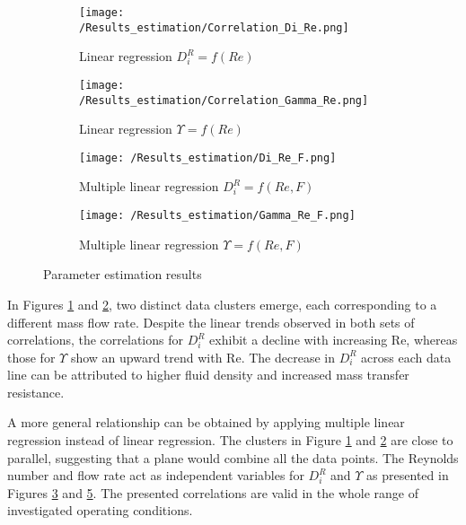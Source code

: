 \documentclass[../Supercritical_fluid_extraction_of_essential_oil_from_chamomile.tex]{subfiles}
\begin{document}
	\begin{figure}[!h]
		\centering
		\begin{subfigure}{0.48\columnwidth}
			\centering
			\texttt{[image: /Results\_estimation/Correlation\_Di\_Re.png]}
			\caption{Linear regression $D_i^R = f(Re)$}
			\label{fig: Correlations_Di_Re}
		\end{subfigure}
		\hfill
		\begin{subfigure}{0.48\columnwidth}
			\centering
			\texttt{[image: /Results\_estimation/Correlation\_Gamma\_Re.png]}
			\caption{Linear regression $\Upsilon = f(Re)$}
			\label{fig: Correlations_Gamma_Re}
		\end{subfigure}
		\hfill
		\begin{subfigure}{0.48\columnwidth}
			\centering
			\texttt{[image: /Results\_estimation/Di\_Re\_F.png]}
			\caption{Multiple linear regression $D_i^R = f(Re, F)$}
			\label{fig: Correlations_Di_Re_F}
		\end{subfigure}
		\hfill
		\begin{subfigure}{0.48\columnwidth}
			\centering
			\texttt{[image: /Results\_estimation/Gamma\_Re\_F.png]}
			\caption{Multiple linear regression $\Upsilon = f(Re, F)$}
			\label{fig: Correlations_Gamma_Re_F}
		\end{subfigure}
		\caption{Parameter estimation results}
	\end{figure}
	
	
	In Figures \ref{fig: Correlations_Di_Re} and \ref{fig: Correlations_Gamma_Re}, two distinct data clusters emerge, each corresponding to a different mass flow rate. Despite the linear trends observed in both sets of correlations, the correlations for $D_i^R$ exhibit a decline with increasing Re, whereas those for $\Upsilon$ show an upward trend with Re. The decrease in $D_i^R$ across each data line can be attributed to higher fluid density and increased mass transfer resistance. %
	
	A more general relationship can be obtained by applying multiple linear regression instead of linear regression. The clusters in Figure \ref{fig: Correlations_Di_Re}  and \ref{fig: Correlations_Gamma_Re} are close to parallel, suggesting that a plane would combine all the data points. The Reynolds number and flow rate act as independent variables for $D_i^R$ and $\Upsilon$ as presented in Figures \ref{fig: Correlations_Di_Re_F} and \ref{fig: Correlations_Gamma_Re_F}. The presented correlations are valid in the whole range of investigated operating conditions.
	
\end{document}
